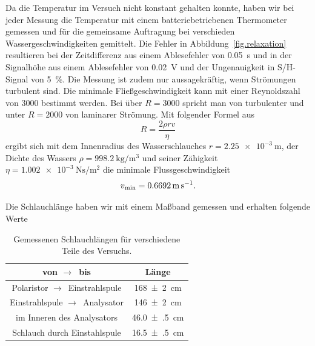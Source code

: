 \documentclass[paper=a4,
	fontsize=10pt,
	DIV=18,
	twocolumn,
	parskip=half
	]{scrartcl}
\numberwithin{equation}{section}    %
\newcommand{\tra}{$\rightarrow $}
\begin{document}
Da die Temperatur im Versuch nicht konstant gehalten konnte, haben wir bei jeder Messung die Temperatur mit einem batteriebetriebenen Thermometer gemessen und für die gemeinsame Auftragung bei verschieden Wassergeschwindigkeiten gemittelt. Die Fehler in Abbildung~\ref{fig.relaxation} resultieren bei der Zeitdifferenz aus einem Ablesefehler von \SI{0.05}{\second} und in der Signalhöhe aus einem Ablesefehler von \SI{0.02}{\volt} und der Ungenauigkeit in S/H-Signal von \SI{5}{\percent}.
Die Messung ist zudem nur aussagekräftig, wenn Strömungen turbulent sind. Die minimale Fließgeschwindigkeit kann mit einer Reynoldszahl von 3000 bestimmt werden. Bei über $R = 3000$ spricht man von turbulenter und unter $R=2000$ von laminarer Strömung. Mit folgender Formel aus~\citet{anleitung}
\begin{equation}
	R=\frac{2\rho rv}{\eta}
\end{equation}
ergibt sich mit dem Innenradius des Wasserschlauches $r=\SI{2.25e-3}{\meter}$, der Dichte des Wassers $\rho=\SI[per-mode=symbol]{998.2}{\kilogram\per\meter^3}$ und seiner Zähigkeit $\eta = \SI[per-mode=symbol]{1.002e-3}{\newton\second\per\meter\squared}$ die minimale Flussgeschwindigkeit
\begin{equation}
	v_{\rm min} = \SI{0.6692}{\meter\per\second}.
	\label{eq.vmin}
\end{equation}

Die Schlauchlänge haben wir mit einem Maßband gemessen und erhalten folgende Werte

\begin{table}[htp]
	\begin{center}
	\begin{tabular}{cc}
		\hline
		von \tra\ bis & Länge \\
		\hline
		Polaristor \tra\ Einstrahlspule & \SI{168(2)}{\centi\meter}\\
		Einstrahlspule \tra\ Analysator & \SI{146(2)}{\centi\meter}\\
		im Inneren des Analysators & \SI{46.0(5)}{\centi\meter}\\
		Schlauch durch Einstahlspule & \SI{16.5(5)}{\centi\meter}\\
		\hline
	\end{tabular}
	\caption{Gemessenen Schlauchlängen für verschiedene Teile des Versuchs.}
	\label{tab.schlauch}
	\end{center}
\end{table}
\end{document}
